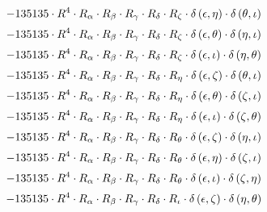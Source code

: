 \begin{subequations}
\begin{gather}
 \\[0.2em] \notag 		 - 135135 \cdot R^{4} \cdot R_{\alpha{}} \cdot R_{\beta{}} \cdot R_{\gamma{}} \cdot R_{\delta{}} \cdot R_{\zeta{}} \cdot \delta{}\left(\epsilon{}, \eta{}\right) \cdot \delta{}\left(\theta{}, \iota{}\right) 
 \\[0.2em] \notag 		 - 135135 \cdot R^{4} \cdot R_{\alpha{}} \cdot R_{\beta{}} \cdot R_{\gamma{}} \cdot R_{\delta{}} \cdot R_{\zeta{}} \cdot \delta{}\left(\epsilon{}, \theta{}\right) \cdot \delta{}\left(\eta{}, \iota{}\right) 
 \\[0.2em] \notag 		 - 135135 \cdot R^{4} \cdot R_{\alpha{}} \cdot R_{\beta{}} \cdot R_{\gamma{}} \cdot R_{\delta{}} \cdot R_{\zeta{}} \cdot \delta{}\left(\epsilon{}, \iota{}\right) \cdot \delta{}\left(\eta{}, \theta{}\right) 
 \\[0.2em] \notag 		 - 135135 \cdot R^{4} \cdot R_{\alpha{}} \cdot R_{\beta{}} \cdot R_{\gamma{}} \cdot R_{\delta{}} \cdot R_{\eta{}} \cdot \delta{}\left(\epsilon{}, \zeta{}\right) \cdot \delta{}\left(\theta{}, \iota{}\right) 
 \\[0.2em] \notag 		 - 135135 \cdot R^{4} \cdot R_{\alpha{}} \cdot R_{\beta{}} \cdot R_{\gamma{}} \cdot R_{\delta{}} \cdot R_{\eta{}} \cdot \delta{}\left(\epsilon{}, \theta{}\right) \cdot \delta{}\left(\zeta{}, \iota{}\right) 
 \\[0.2em] \notag 		 - 135135 \cdot R^{4} \cdot R_{\alpha{}} \cdot R_{\beta{}} \cdot R_{\gamma{}} \cdot R_{\delta{}} \cdot R_{\eta{}} \cdot \delta{}\left(\epsilon{}, \iota{}\right) \cdot \delta{}\left(\zeta{}, \theta{}\right) 
 \\[0.2em] \notag 		 - 135135 \cdot R^{4} \cdot R_{\alpha{}} \cdot R_{\beta{}} \cdot R_{\gamma{}} \cdot R_{\delta{}} \cdot R_{\theta{}} \cdot \delta{}\left(\epsilon{}, \zeta{}\right) \cdot \delta{}\left(\eta{}, \iota{}\right) 
 \\[0.2em] \notag 		 - 135135 \cdot R^{4} \cdot R_{\alpha{}} \cdot R_{\beta{}} \cdot R_{\gamma{}} \cdot R_{\delta{}} \cdot R_{\theta{}} \cdot \delta{}\left(\epsilon{}, \eta{}\right) \cdot \delta{}\left(\zeta{}, \iota{}\right) 
 \\[0.2em] \notag 		 - 135135 \cdot R^{4} \cdot R_{\alpha{}} \cdot R_{\beta{}} \cdot R_{\gamma{}} \cdot R_{\delta{}} \cdot R_{\theta{}} \cdot \delta{}\left(\epsilon{}, \iota{}\right) \cdot \delta{}\left(\zeta{}, \eta{}\right) 
 \\[0.2em] \notag 		 - 135135 \cdot R^{4} \cdot R_{\alpha{}} \cdot R_{\beta{}} \cdot R_{\gamma{}} \cdot R_{\delta{}} \cdot R_{\iota{}} \cdot \delta{}\left(\epsilon{}, \zeta{}\right) \cdot \delta{}\left(\eta{}, \theta{}\right) 

\end{gather}
\end{subequations}

